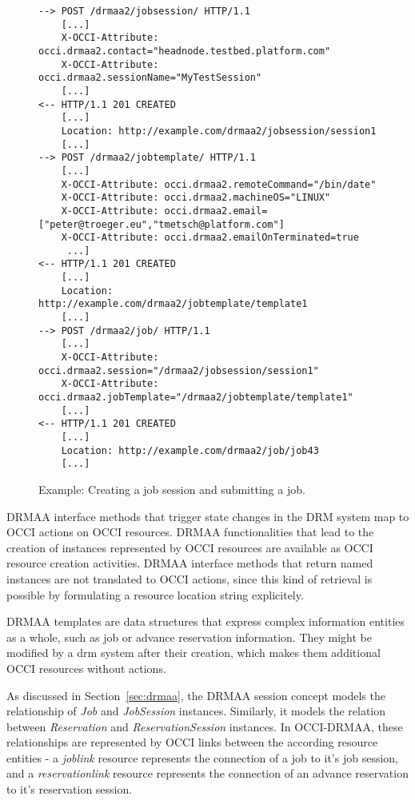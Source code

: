 \documentclass[twocolumn]{svjour3}       %
\begin{document}
\begin{figure*}
\center
\begin{lstlisting}
--> POST /drmaa2/jobsession/ HTTP/1.1
    [...]
    X-OCCI-Attribute: occi.drmaa2.contact="headnode.testbed.platform.com"
    X-OCCI-Attribute: occi.drmaa2.sessionName="MyTestSession"
    [...]
<-- HTTP/1.1 201 CREATED 
    [...] 
    Location: http://example.com/drmaa2/jobsession/session1
    [...]
--> POST /drmaa2/jobtemplate/ HTTP/1.1
    [...]
    X-OCCI-Attribute: occi.drmaa2.remoteCommand="/bin/date"
    X-OCCI-Attribute: occi.drmaa2.machineOS="LINUX"
    X-OCCI-Attribute: occi.drmaa2.email=["peter@troeger.eu","tmetsch@platform.com"]
    X-OCCI-Attribute: occi.drmaa2.emailOnTerminated=true
     ...]
<-- HTTP/1.1 201 CREATED 
    [...] 
    Location: http://example.com/drmaa2/jobtemplate/template1
    [...]
--> POST /drmaa2/job/ HTTP/1.1
    [...]
    X-OCCI-Attribute: occi.drmaa2.session="/drmaa2/jobsession/session1"
    X-OCCI-Attribute: occi.drmaa2.jobTemplate="/drmaa2/jobtemplate/template1"
    [...]
<-- HTTP/1.1 201 CREATED 
    [...] 
    Location: http://example.com/drmaa2/job/job43
    [...]
\end{lstlisting}
\caption{Example: Creating a job session and submitting a job.}
\label{fig:createjob} 
\end{figure*}

DRMAA interface methods that trigger state changes in the DRM system map to OCCI actions on OCCI resources. DRMAA functionalities that lead to the creation of instances represented by OCCI resources are available as OCCI resource creation activities. DRMAA interface methods that return named instances are not translated to OCCI actions, since this kind of retrieval is possible by formulating a resource location string explicitely. 

DRMAA templates are data structures that express complex information entities as a whole, such as job or advance reservation information. They might be modified by a \gls{drm} system after their creation, which makes them additional OCCI resources without actions.

As discussed in Section~\ref{sec:drmaa}, the DRMAA session concept models the relationship of \emph{Job} and \emph{JobSession} instances. Similarly, it models the relation between \emph{Reservation} and \emph{ReservationSession} instances. In OCCI-DRMAA, these relationships are represented by OCCI links between the according resource entities -  a \emph{joblink} resource represents the connection of a job to it's job session, and a \emph{reservationlink} resource represents the connection of an advance reservation to it's reservation session.
\end{document}
